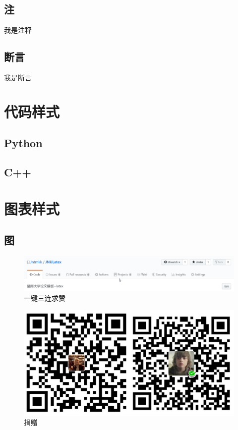 \subsection{注}
    \begin{note}
        我是注释
    \end{note}
\subsection{断言}
    \begin{asset}
        我是断言
    \end{asset}
\clearpage
\section[代码样式]{代码样式}
\subsection{Python}
\subsection{C++}

\clearpage
\section[图表样式]{图表样式}
\subsection{图}
\lipsum[1]
\begin{figure}[htbp]
    \centering
    \includegraphics[width=\textwidth]{image/star.png}
    \caption{一键三连求赞}
\end{figure}
\begin{figure}[htbp]
    \centering
    \includegraphics[scale=.3]{image/donate.jpg}
    \caption{捐赠}
\end{figure}
\lipsum[2]
